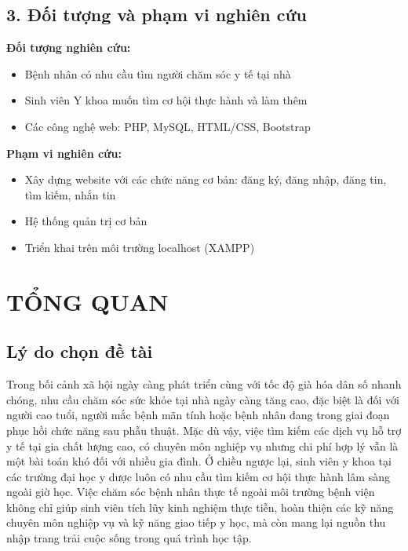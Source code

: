 \documentclass[a4paper,13pt]{extreport}
\begin{document}
\section*{3. Đối tượng và phạm vi nghiên cứu}

\textbf{Đối tượng nghiên cứu:}
\begin{itemize}
    \item Bệnh nhân có nhu cầu tìm người chăm sóc y tế tại nhà
    \item Sinh viên Y khoa muốn tìm cơ hội thực hành và làm thêm
    \item Các công nghệ web: PHP, MySQL, HTML/CSS, Bootstrap
\end{itemize}

\textbf{Phạm vi nghiên cứu:}
\begin{itemize}
    \item Xây dựng website với các chức năng cơ bản: đăng ký, đăng nhập, đăng tin, tìm kiếm, nhắn tin
    \item Hệ thống quản trị cơ bản
    \item Triển khai trên môi trường localhost (XAMPP)
\end{itemize}

\chapter{TỔNG QUAN}

\section{Lý do chọn đề tài}
Trong bối cảnh xã hội ngày càng phát triển cùng với tốc độ già hóa dân số nhanh chóng, nhu cầu chăm sóc sức khỏe tại nhà ngày càng tăng cao, đặc biệt là đối với người cao tuổi, người mắc bệnh mãn tính hoặc bệnh nhân đang trong giai đoạn phục hồi chức năng sau phẫu thuật. Mặc dù vậy, việc tìm kiếm các dịch vụ hỗ trợ y tế tại gia chất lượng cao, có chuyên môn nghiệp vụ nhưng chi phí hợp lý vẫn là một bài toán khó đối với nhiều gia đình. Ở chiều ngược lại, sinh viên y khoa tại các trường đại học y dược luôn có nhu cầu tìm kiếm cơ hội thực hành lâm sàng ngoài giờ học. Việc chăm sóc bệnh nhân thực tế ngoài môi trường bệnh viện không chỉ giúp sinh viên tích lũy kinh nghiệm thực tiễn, hoàn thiện các kỹ năng chuyên môn nghiệp vụ và kỹ năng giao tiếp y học, mà còn mang lại nguồn thu nhập trang trải cuộc sống trong quá trình học tập.
\end{document}
